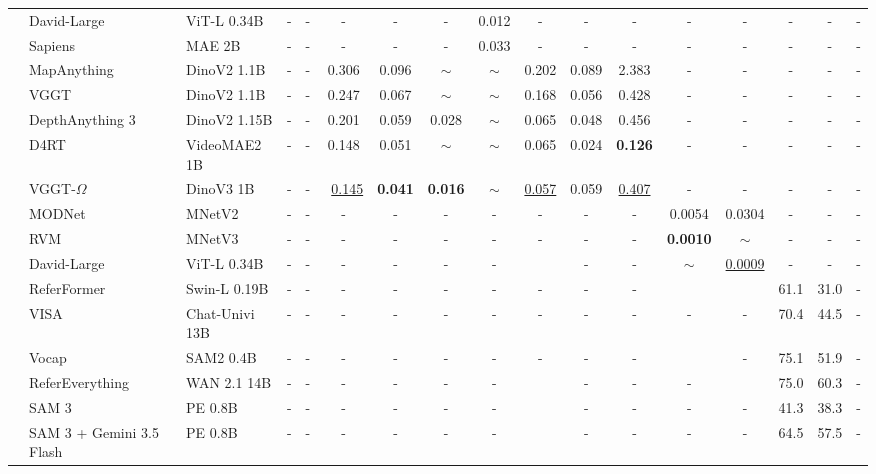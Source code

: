 \documentclass[11pt, a4paper, logo, onecolumn]{googledeepmind}
\begin{document}
\begin{table}[t]
{\begin{tabular}{@{}ll l cc cc ccc cc cccc c@{}}
\midrule

& David-Large~\cite{saleh2025david} & ViT-L 0.34B & - & - & - & - & - & {0.012} & - & - & - & - & -  & - & - &  - \\
& Sapiens~\cite{sapienseccv2024} & MAE 2B & - & - & - & - & - & 0.033 & - & - & - & - & - & - & - & -   \\
& MapAnything~\cite{keetha2025mapanything} & DinoV2 1.1B & - & - & 0.306 & 0.096 & $\sim$ & $\sim$ & 0.202 & 0.089 & 2.383 & - & - & - & - & - \\
& VGGT~\cite{wang2025vggt} & DinoV2 1.1B & - & - & {0.247} & {0.067} & $\sim$ & $\sim$ & 0.168 & 0.056 & 0.428 & - & - & - & - & -  \\
& DepthAnything 3~\cite{lin2025depth} & DinoV2 1.15B  & - & - & 0.201 & 0.059 & {0.028} & $\sim$ & {0.065} & 0.048 & 0.456 & - & -  & -  & - & - \\
& D4RT~\cite{zhang2025efficiently} & VideoMAE2 1B & - & - & 0.148 & 0.051 & $\sim$ & $\sim$ & {0.065} & {0.024} & \textbf{0.126} & - & - & - & - & - \\

& VGGT-$\Omega$~\cite{wang2026vggt} & DinoV3 1B  & - & - & ~\underline{0.145} & \textbf{0.041} & \textbf{0.016} & $\sim$ & \underline{0.057} & 0.059 & \underline{0.407} & - & - & - & - & - \\




\midrule
& MODNet~\cite{ke2022modnet} & MNetV2 & -  & - & - & - & - & - & - & - & - & 0.0054 & 0.0304 & - & - & - \\
& RVM~\cite{lin2022robust} & MNetV3  & -   & - & - & - & - & - & - & - & - & \textbf{0.0010} & $\sim$ & - & - & - \\
& David-Large~\cite{saleh2025david} & ViT-L 0.34B & - & - & - & - & - & - &  & - & - & $\sim$ & \underline{0.0009} & -  & - & - \\

\midrule
& ReferFormer~\cite{wu2022language} & Swin-L 0.19B & -  & - & - & - & - & - & - & - & - &  &  & 61.1 & 31.0 & - \\
& VISA~\cite{yan2024visa} & Chat-Univi 13B & -  & - & - & - & - & - & - & - & - & - & - & 70.4 & 44.5 & - \\
& Vocap~\cite{uijlings2025vocap} & SAM2 0.4B & -  & - & - & - & - & - & - & - & - &  & - & 75.1 & 51.9 & - \\
& ReferEverything~\cite{bagchi2025refereverything} & WAN 2.1 14B & - & - & - & - & - & - &  & - & - & - &  & 75.0  & 60.3 & - \\
& SAM 3~\cite{carion2025sam} & PE 0.8B & - & - & - & - & - & - &  & - & - & - & - & 41.3 & 38.3 & - \\
& SAM 3 + Gemini 3.5 Flash~\cite{carion2025sam} & PE 0.8B & - & - & - & - & - & - &  & - & - & - & - & 64.5 & 57.5 & - \\







\end{tabular}}
\end{table}
\end{document}
